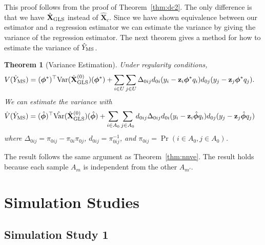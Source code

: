 \documentclass[12pt]{article}
\newtheorem{theorem}{Theorem}
\newcommand{\Var}{{\text{Var}}}
\renewcommand{\bf}[1]{\mathbf{#1}}
\begin{document}
This proof follows from the proof of Theorem~\ref{thm:dc2}. The only
difference is that we have $\hat{\bf X}_{\rm GLS}$ instead of $\hat{\bf X}_c$.
Since we have shown equivalence between our estimator and a regression estimator
we can estimate the variance by giving the variance of the regression estimator.
The next theorem gives a method for how to estimate the variance of 
$\hat Y_{\rm MS}$.
\begin{theorem}[Variance Estimation]
  Under regularity conditions,
  $$
  \begin{aligned}
    V(\hat Y_{\rm MS}) 
    &= (\bm \phi^{*})^\top \Var(\hat{\bf X}_{\rm GLS}^{(0)}) (\bm \phi^{*}) + 
      \sum_{i \in U} \sum_{j \in U} \Delta_{0ij}
      d_{0i}(y_i - \bf z_i\bm \phi^{*}q_i)
      d_{0j}(y_j - \bf z_j\bm \phi^{*}q_j). 
  \end{aligned}
  $$
  We can estimate the variance with
  $$
  \begin{aligned}
    \hat V(\hat Y_{\rm MS}) 
    &= (\hat{\bm \phi})^\top \hat \Var(\hat{\bf X}_{\rm GLS}^{(0)}) (\hat{\bm \phi})
  + \sum_{i \in A_0} \sum_{j \in A_0} d_{0ij}\Delta_{0ij}
    d_{0i}(y_i - \bf z_i \hat{\bm \phi}q_i)
    d_{0j}(y_j - \bf z_j \hat{\bm \phi}q_j)
  \end{aligned}
  $$
  where $\Delta_{0ij} = \pi_{0ij} - \pi_{0i}\pi_{0j}$, $d_{0ij} = \pi_{0ij}^{-1}$,
  and $\pi_{0ij} = \Pr(i \in A_0, j\in A_0)$.
\end{theorem}
The result follows the same argument as Theorem~\ref{thm:nnve}. The result
holds because each sample $A_m$ is independent from the other $A_{m'}$.

\section{Simulation Studies}

\subsection{Simulation Study 1}
\end{document}
